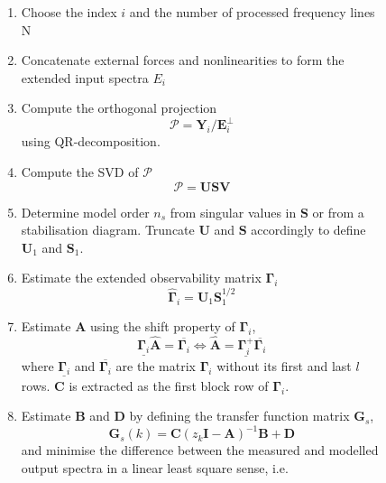 \begin{figure}[!ht]
  \centering
  \begin{mdframed}
    \begin{enumerate}
    \item Choose the index $i$ and the number of processed frequency lines N
    \item Concatenate external forces and nonlinearities to form the extended
      input spectra $E_i$
    \item Compute the orthogonal projection
      \begin{equation*}
        \mathcal{P} = \bm Y_i / \bm E_i^\perp
      \end{equation*}
      using QR-decomposition.
    \item Compute the SVD of $\mathcal{P}$
      \begin{equation}
        \label{eq:fnsi_svd}
        \mathcal{P} = \bm U \bm S \bm V
      \end{equation}
    \item Determine model order $n_s$ from singular values in $\bm S$ or from a
      stabilisation diagram. Truncate $\bm U$ and $\bm S$ accordingly to define
      $\bm U_1$ and $\bm S_1$.
    \item Estimate the extended observability matrix $\bm \Gamma_i$
      \begin{equation*}
        \hat{\bm \Gamma}_i = \bm U_1 \bm S_1^{1/2}
      \end{equation*}
    \item Estimate $\bm A$ using the shift property of $\bm \Gamma_i$,
      \begin{equation*}
        \underline{\bm \Gamma_i} \hat {\bm A} = \overline{\bm \Gamma_i}
        \iff
        \hat {\bm A} = \underline{\bm \Gamma^+_i} \overline{\bm \Gamma_i}
      \end{equation*}
      where $\underline{\bm \Gamma_i}$ and $\overline{\bm \Gamma_i}$ are the
      matrix $\bm \Gamma_i$ without its first and last $l$ rows.
      $\bm C$ is extracted as the first block row of $\bm \Gamma_i$.
    \item Estimate $\bm B$ and $\bm D$ by defining the transfer function matrix
      $\bm G_s$,
      \begin{equation*}
        \bm G_s(k) = \bm C(z_k \bm I - \bm A)^{-1} \bm B + \bm D
      \end{equation*}
      and minimise the difference between the measured and modelled output
      spectra in a linear least square sense, i.e.
      \begin{equation*}

\end{equation*}
\end{enumerate}
\end{mdframed}
\end{figure}
